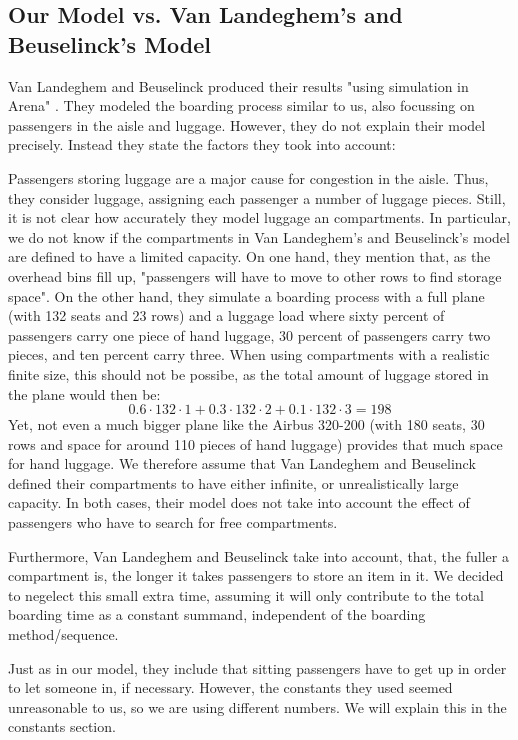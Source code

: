 \documentclass[11pt]{article}
\begin{document}
\subsection{Our Model vs. Van Landeghem's and Beuselinck's Model} 

Van Landeghem and Beuselinck produced their results "using simulation in Arena" \cite{beus}. They modeled the boarding process similar to us, also focussing on passengers in the aisle and luggage. However, they do not explain their model precisely. Instead they state the factors they took into account:


Passengers storing luggage are a major cause for congestion in the aisle. Thus, they consider luggage, assigning each passenger a number of luggage pieces. Still, it is not clear how accurately they model luggage an compartments. In particular, we do not know if the compartments in Van Landeghem's and Beuselinck's model are defined to have a limited capacity. On one hand, they mention that, as the overhead bins fill up, "passengers will have to move to other rows to find storage space"\cite{beus}. On the other hand, they simulate a boarding process with a full plane (with 132 seats and 23 rows) and a luggage load where sixty percent of passengers carry one piece of hand luggage, 30 percent of passengers carry two pieces, and ten percent carry three. When using compartments with a realistic finite size, this should not be possibe, as the total amount of luggage stored in the plane would then be:
$$ 0.6 \cdot 132 \cdot 1+ 0.3 \cdot 132 \cdot 2 + 0.1 \cdot 132 \cdot 3 = 198$$
Yet, not even a much bigger plane like the Airbus 320-200 (with 180 seats, 30 rows and space for around 110 pieces of hand luggage) provides that much space for hand luggage. We therefore assume that Van Landeghem and Beuselinck defined their compartments to have either infinite, or unrealistically large capacity. In both cases, their model does not take into account the effect of passengers who have to search for free compartments.


Furthermore, Van Landeghem and Beuselinck take into account, that, the fuller a compartment is, the longer it takes passengers to store an item in it. We decided to negelect this small extra time, assuming it will only contribute to the total boarding time as a constant summand, independent of the boarding method/sequence.


Just as in our model, they include that sitting passengers have to get up in order to let someone in, if necessary. However, the constants they used seemed unreasonable to us, so we are using different numbers. We will explain this in the constants section.
\end{document}
